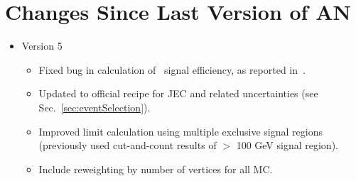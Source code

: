 \section{Changes Since Last Version of AN}

\begin{itemize}
\item Version 5
\begin{itemize}
\item Fixed bug in calculation of \wzmet\ signal efficiency, as reported in~\cite{HNbug}.
\item Updated to official recipe for JEC and related uncertainties (see Sec.~\ref{sec:eventSelection}).
\item Improved limit calculation using multiple exclusive signal regions (previously used cut-and-count results of \MET $>$ 100 GeV signal region).
\item Include reweighting by number of vertices for all MC.
\end{itemize}
\end{itemize}
